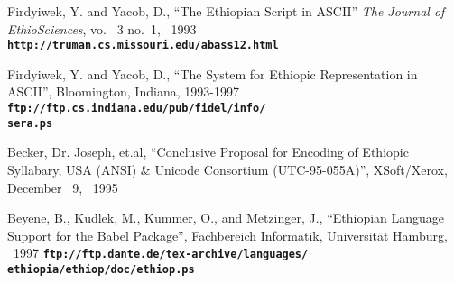 

\begin{thebibliography}{2}

 Firdyiwek, Y. and Yacob, D., ``The Ethiopian Script in ASCII''
\emph{The Journal of EthioSciences}, vo. ~3 no.~1, ~1993
{\texttt{\textbf{http://truman.cs.missouri.edu/abass12.html}}}

 Firdyiwek, Y. and Yacob, D., ``The System for Ethiopic Representation in ASCII'',
Bloomington, Indiana, 1993-1997
{\texttt{\textbf{ftp://ftp.cs.indiana.edu/pub/fidel/info/\\sera.ps}}}

 Becker, Dr. Joseph, et.al, ``Conclusive Proposal for Encoding of
Ethiopic Syllabary, USA (ANSI) \& Unicode Consortium (UTC-95-055A)'', XSoft/Xerox, December
~9, ~1995

 Beyene, B., Kudlek, M., Kummer, O., and Metzinger, J.,
``Ethiopian Language Support for the Babel Package'', 
Fachbereich Informatik, Universit\"{a}t Hamburg, ~1997
{\texttt{\textbf{ftp://ftp.dante.de/tex-archive/languages/\\ethiopia/ethiop/doc/ethiop.ps}}} 

\end{thebibliography}

